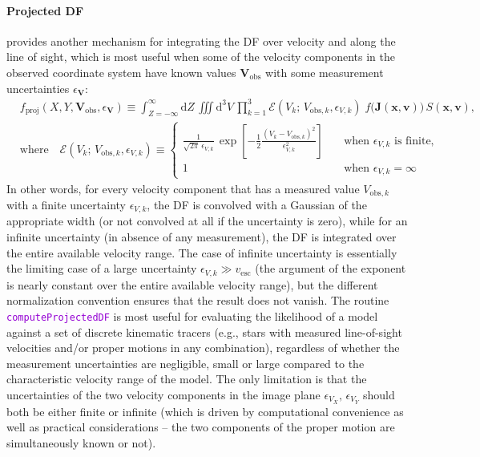 \documentclass[12pt]{article}
\newcommand{\ttt}[1]{\textcolor{darkviolet}{\texttt{#1}}}
\renewcommand{\d}{\mathrm{d}}
\newcommand{\bv}{\boldsymbol{v}}
\newcommand{\bx}{\boldsymbol{x}}
\newcommand{\bV}{\boldsymbol{V}}
\newcommand{\bJ}{\boldsymbol{J}}
\let\oldparagraph\paragraph
\renewcommand{\paragraph}[1]{\vspace{-2mm}\oldparagraph{#1}}
\begin{document}
\paragraph{Projected DF}  \label{sec:ProjectedDF} provides another mechanism for integrating the DF over velocity and along the line of sight, which is most useful when some of the velocity components in the observed coordinate system have known values $\bV_\mathrm{\!\!obs}$ with some measurement uncertainties $\epsilon_{\bV}$:
\begin{align*}
&f_\mathrm{proj}(X, Y, \bV_\mathrm{\!\!obs}, \epsilon_{\bV}) \equiv \int_{Z=-\infty}^\infty \d Z\, \iiint \d^3V\, \prod_{k=1}^3 \mathcal E(V_k;\,V_{\mathrm{obs},k}, \epsilon_{V,k})\;
f\big(\bJ(\bx,\bv)\big)\,S(\bx,\bv) ,\\
&\mbox{where}\quad \mathcal E(V_k;\,V_{\mathrm{obs},k}, \epsilon_{V,k}) \equiv
\left\{ \begin{array}{ll} \displaystyle \frac{1}{\sqrt{2\pi}\,\epsilon_{V,k}}\, \exp\left[-\frac{1}{2} \frac{(V_k-V_{\mathrm{obs},k})^2}{\epsilon_{V,k}^2} \right] &\quad\mbox{when }\epsilon_{V,k}\mbox{ is finite}, \\[6mm]
\displaystyle 1 & \quad\mbox{when }\epsilon_{V,k}=\infty \end{array} \right.
\end{align*}
In other words, for every velocity component that has a measured value $V_{\mathrm{obs},k}$ with a finite uncertainty $\epsilon_{V,k}$, the DF is convolved with a Gaussian of the appropriate width (or not convolved at all if the uncertainty is zero), while for an infinite uncertainty (in absence of any measurement), the DF is integrated over the entire available velocity range. The case of infinite uncertainty is essentially the limiting case of a large uncertainty $\epsilon_{V,k} \gg v_\mathrm{esc}$ (the argument of the exponent is nearly constant over the entire available velocity range), but the different normalization convention ensures that the result does not vanish. The routine \ttt{computeProjectedDF} is most useful for evaluating the likelihood of a model against a set of discrete kinematic tracers (e.g., stars with measured line-of-sight velocities and/or proper motions in any combination), regardless of whether the measurement uncertainties are negligible, small or large compared to the characteristic velocity range of the model. The only limitation is that the uncertainties of the two velocity components in the image plane $\epsilon_{V_X},\, \epsilon_{V_Y}$ should both be either finite or infinite (which is driven by computational convenience as well as practical considerations -- the two components of the proper motion are simultaneously known or not).
\end{document}
